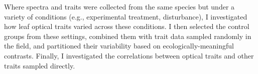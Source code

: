 Where spectra and traits were collected from the same species but under a variety of conditions (e.g., experimental treatment, disturbance), I investigated how leaf optical traits varied across these conditions.
I then selected the control groups from these settings, combined them with trait data sampled randomly in the field, and partitioned their variability based on ecologically-meaningful contrasts.
Finally, I investigated the correlations between optical traits and other traits sampled directly.
% 
% 
% 
% 
%
